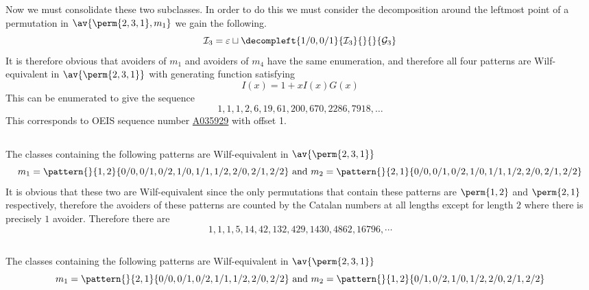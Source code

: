 Now we must consolidate these two subclasses. In order to do this we must
consider the decomposition around the leftmost point of a permutation in
\(\av{\perm{2,3,1},m_1}\) we gain the following.
\begin{equation*}
    \mathcal{I}_3 = \varepsilon \sqcup
    \decompleft{1/0,0/1}{\mathcal{I}_3}{}{}{\mathcal{G}_3}
\end{equation*}
It is therefore obvious that avoiders of \(m_1\) and avoiders of \(m_4\)
have the same enumeration, and therefore all four patterns are Wilf-equivalent
in \(\av{\perm{2,3,1}}\) with generating function satisfying
\begin{equation*}
    I(x) = 1 + xI(x)G(x)
\end{equation*}
This can be enumerated to give the sequence
\begin{equation*}
    1, 1, 1, 2, 6, 19, 61, 200, 670, 2286, 7918,\dotsc
\end{equation*}
This corresponds to OEIS sequence number \href{https://oeis.org/A035929}{A035929}
with offset 1.

\subsection{}
The classes containing the following patterns are Wilf-equivalent
in \(\av{\perm{2,3,1}}\)
\begin{equation*}
    m_1 = \pattern{}{1,2}{0/0,0/1,0/2,
                    1/0,1/1,1/2,
                    2/0,2/1,2/2}
    \text{ and }
    m_2 = \pattern{}{2,1}{0/0,0/1,0/2,
                    1/0,1/1,1/2,
                    2/0,2/1,2/2}
\end{equation*}
It is obvious that these two are Wilf-equivalent since the only
permutations that contain these patterns are \(\perm{1,2}\) and
\(\perm{2,1}\) respectively, therefore the avoiders of these patterns
are counted by the Catalan numbers at all lengths except for length
\(2\) where there is precisely \(1\) avoider.
Therefore there are
\begin{equation*}
    1, 1, 1, 5, 14, 42, 132, 429, 1430, 4862, 16796,\cdots
\end{equation*}

\subsection{}

The classes containing the following patterns are Wilf-equivalent
in \(\av{\perm{2,3,1}}\)
\begin{equation*}
    m_1 = \pattern{}{2,1}{0/0,0/1,0/2,
                    1/1,1/2,
                    2/0,2/2}
    \text{ and }
    m_2 = \pattern{}{1,2}{0/1,0/2,
                    1/0,1/2,
                    2/0,2/1,2/2}
\end{equation*}

